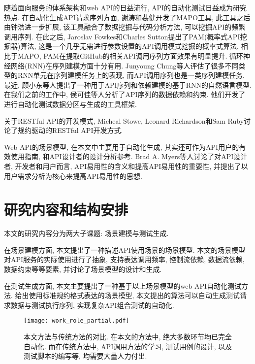     	随着面向服务的体系架构和web API的日益流行, API的自动化测试日益成为研究热点. 在自动化生成API请求序列方面, 谢涛和裴健\cite{taox06}开发了MAPO工具, 此工具之后由钟浩进一步扩展\cite{Zhong2009}, 该工具融合了数据挖掘与代码分析方法, 可以挖掘API的频繁调用序列. 在此之后, Jaroslav Fowkes和Charles Sutton\cite{fowkes2016parameter}提出了PAM(概率式API挖掘器)算法, 这是一个几乎无需进行参数设置的API调用模式挖掘的概率式算法. 相比于MAPO, PAM在提取GitHub的相关API调用序列方面效果有明显提升. 循环神经网络(RNN)在序列建模方面十分有用. Junyoung Chung等人\cite{chung2014empirical}评估了很多不同类型的RNN单元在序列建模任务上的表现, 而API调用序列也是一类序列建模任务. 最近, 顾小东等人\cite{xiaodongg16}提出了一种用于API序列和依赖建模的基于RNN的自然语言模型. 在我们之前的工作中, 侯可佳等人\cite{kejiah13}分析了API序列的数据依赖和约束. 他们开发了进行自动化测试数据分区与生成的工具框架. 
    	
    	关于RESTful API的开发模式, Micheal Stowe\cite{michaels15}, Leonard Richardson和Sam Ruby\cite{leonardr07}讨论了规约驱动的RESTful API开发方式.
    	
    	Web API的场景模型, 在本文中主要用于自动化生成, 其实还可作为API用户的有效使用指南, 和API设计者的设计分析参考. Brad A. Myers等人\cite{bradm17}讨论了对API设计者, 开发者和用户而言, API易用性的含义和提高API易用性的重要性, 并提出了以用户需求分析为核心来提高API易用性的思想.

	\section{研究内容和结构安排}
	
	    本文的研究内容分为两大子课题: 场景建模与测试生成.
	
	    在场景建模方面, 本文提出了一种描述API使用场景的场景模型. 本文的场景模型对API服务的实际使用进行了抽象, 支持表达调用频率, 控制流依赖, 数据流依赖, 数据约束等等要素, 并讨论了场景模型的设计和生成.
	
        在测试生成方面, 本文主要提出了一种基于以上场景模型的web API自动化测试方法. 给出使用标准规约格式表达的场景模型, 本文提出的算法可以自动生成测试请求数据与测试执行序列, 实现复杂API组合测试的自动化.
        
        \begin{figure}[!htb]
            \centering
            \texttt{[image: work\_role\_partial.pdf]}
            \caption{本文方法与传统方法的对比. 在本文的方法中, 绝大多数环节均已完全自动化. 而在传统方法中, API调用方法的学习, 测试用例的设计, 以及测试脚本的编写等, 均需要大量人力付出.}
            \label{fig:overview}
        \end{figure}
        
